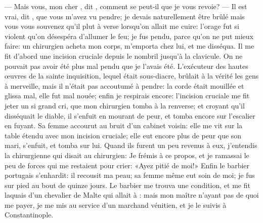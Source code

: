 — Mais vous, mon cher , dit , comment se peut-il que je
vous revoie? — Il est vrai, dit , que vous m’avez vu pendre; je
devais naturellement être brûlé mais vous vous souvenez qu’il plut à
verse lorsqu’on allait me cuire: l’orage fut si violent qu’on désespéra
d’allumer le feu; je fus pendu, parce qu’on ne put mieux faire: un
chirurgien acheta mon corps, m’emporta chez lui, et me disséqua. Il me
fit d’abord une incision cruciale depuis le nombril jusqu’à la
clavicule. On ne pouvait pas avoir été plus mal pendu que je l’avais
été. L’exécuteur des hautes œuvres de la sainte inquisition, lequel
était sous-diacre, brûlait à la vérité les gens à merveille, mais il
n’était pas accoutumé à pendre: la corde était mouillée et glissa mal,
elle fut mal nouée; enfin je respirais encore: l’incision cruciale me
fit jeter un si grand cri, que mon chirurgien tomba à la renverse; et
croyant qu’il disséquait le diable, il s’enfuit en mourant de peur, et
tomba encore sur l’escalier en fuyant. Sa femme accourut au bruit d’un
cabinet voisin: elle me vit sur la table étendu avec mon incision
cruciale; elle eut encore plus de peur que son mari, s’enfuit, et tomba
sur lui. Quand ils furent un peu revenus à eux, j’entendis la
chirurgienne qui disait au chirurgien: \localleftbox{}
Je frémis à ce propos, et je ramassai le
peu de forces qui me restaient pour crier: «Ayez pitié de moi!» Enfin le
barbier portugais s’enhardit: il recousit ma peau; sa femme même eut
soin de moi; je fus sur pied au bout de quinze jours. Le barbier me
trouva une condition, et me fit laquais d’un chevalier de Malte qui
allait à  : mais mon maître n’ayant pas de quoi me payer, je me
mis au service d’un marchand vénitien, et je le suivis à
Constantinople.


